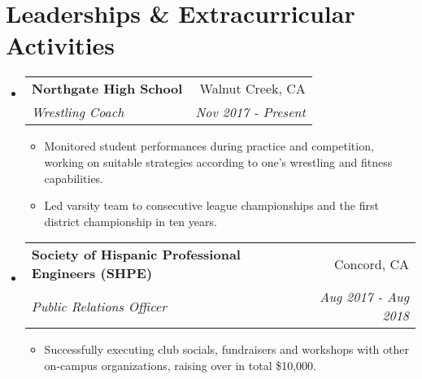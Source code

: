 \documentclass[letterpaper,11pt]{article}
\makeatletter
\newcommand{\resumeSubheading}[4]{
  \vspace{-1pt}\item
    \begin{tabular*}{0.97\textwidth}{l@{\extracolsep{\fill}}r}
      \textbf{#1} & #2 \\
      \textit{\small#3} & \textit{\small #4} \\
    \end{tabular*}\vspace{-5pt}
}
\newcommand{\resumeSubHeadingListStart}{\begin{itemize}[leftmargin=*]}
\newcommand{\resumeSubHeadingListEnd}{\end{itemize}}
\makeatother
\begin{document}
\section{Leaderships \& Extracurricular Activities}
\resumeSubHeadingListStart
  	\resumeSubheading
  	{Northgate High School}{Walnut Creek, CA}
  	{Wrestling Coach}{Nov 2017 - Present}
  	\begin{itemize}
  		\item {Monitored student performances during practice and competition, working on suitable strategies according to one's wrestling and fitness capabilities.}
  		\item {Led varsity team to consecutive league championships and the first district championship in ten years.}
    \end{itemize}
	\resumeSubheading
	{Society of Hispanic Professional Engineers (SHPE)}{Concord, CA}
	{Public Relations Officer}{Aug 2017 - Aug 2018}
	\begin{itemize}
		\item {Successfully executing club socials, fundraisers and workshops with other on-campus organizations, raising over in total \$10,000.}  
	\end{itemize}
\resumeSubHeadingListEnd
   


	
\end{document}
